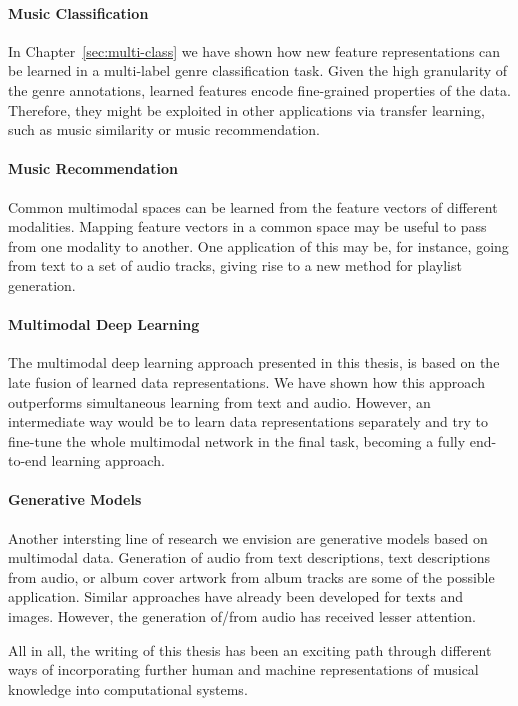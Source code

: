 \paragraph{Music Classification} In Chapter~\ref{sec:multi-class} we have shown how new feature representations can be learned in a multi-label genre classification task. Given the high granularity of the genre annotations, learned features encode fine-grained properties of the data. Therefore, they might be exploited in other applications via transfer learning, such as music similarity or music recommendation. 

\paragraph{Music Recommendation} Common multimodal spaces can be learned from the feature vectors of different modalities. Mapping feature vectors in a common space may be useful to pass from one modality to another. One application of this may be, for instance, going from text to a set of audio tracks, giving rise to a new method for playlist generation.

\paragraph{Multimodal Deep Learning}
The multimodal deep learning approach presented in this thesis, is based on the late fusion of learned data representations. We have shown how this approach outperforms simultaneous learning from text and audio. However, an intermediate way would be to learn data representations separately and try to fine-tune the whole multimodal network in the final task, becoming a fully end-to-end learning approach.

\paragraph{Generative Models} Another intersting line of research we envision are generative models based on multimodal data. Generation of audio from text descriptions, text descriptions from audio, or album cover artwork from album tracks are some of the possible application. Similar approaches have already been developed for texts and images. However, the generation of/from audio has received lesser attention.

\vspace{0.2cm}


All in all, the writing of this thesis has been an exciting path through different ways of incorporating further human and machine representations of musical knowledge into computational systems.